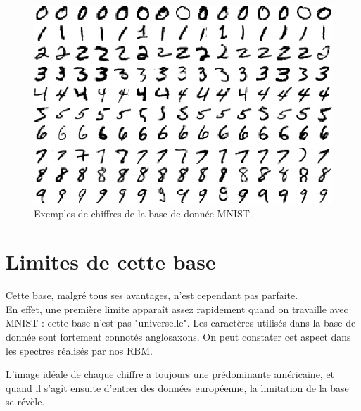 \documentclass[a4paper,oneside]{report}
\begin{document}
                \begin{figure}
                    \begin{center}
                        \includegraphics{Images/mnist-01.png}
                    \end{center}
                    \caption{Exemples de chiffres de la base de donnée MNIST.}
                \end{figure}


            \section{Limites de cette base}

                Cette base, malgré tous ses avantages, n'est cependant pas parfaite.\\

                En effet, une première limite apparaît assez rapidement quand on travaille avec MNIST : cette base n'est pas "universelle". Les caractères utilisés dans la base de donnée sont fortement connotés anglosaxons. On peut constater cet aspect dans les spectres réalisés par nos RBM.

                L'image idéale de chaque chiffre a toujours une prédominante américaine, et quand il s'agît ensuite d'entrer des données européenne, la limitation de la base se révèle.\\
\end{document}
